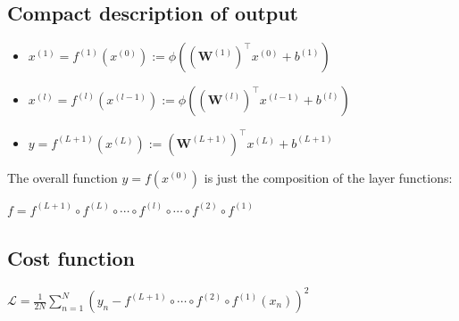 \subsection*{Compact description of output}

\begin{itemize}
  \item $x^{(1)}=f^{(1)}\left(x^{(0)}\right):=\phi\left(\left(\mathbf{W}^{(1)}\right)^{\top} x^{(0)}+b^{(1)}\right)$
  \item $x^{(l)}=f^{(l)}\left(x^{(l-1)}\right):=\phi\left(\left(\mathbf{W}^{(l)}\right)^{\top} x^{(l-1)}+b^{(l)}\right)$
  \item $y=f^{(L+1)}\left(x^{(L)}\right):=\left(\mathbf{W}^{(L+1)}\right)^{\top} x^{(L)}+b^{(L+1)}$
\end{itemize}

The overall function $y=f\left(x^{(0)}\right)$ is just the composition of the layer functions:

$
f=f^{(L+1)} \circ f^{(L)} \circ \cdots \circ f^{(l)} \circ \cdots \circ f^{(2)} \circ f^{(1)}
$

\subsection*{Cost function}

$
\mathscr{L}=\frac{1}{2 N} \sum_{n=1}^{N}\left(y_{n}-f^{(L+1)} \circ \cdots \circ f^{(2)} \circ f^{(1)}\left(x_{n}\right)\right)^{2}
$








